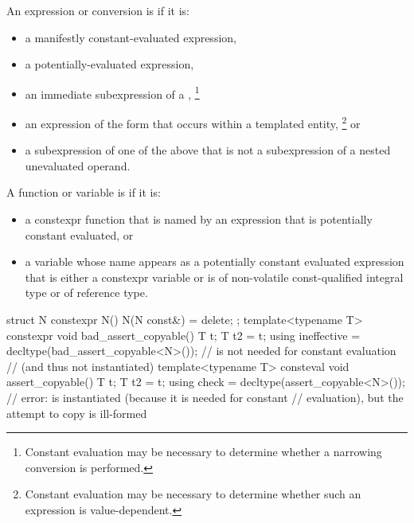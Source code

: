 \pnum
{}%
An expression or conversion is 
if it is:
\begin{itemize}
\item
a manifestly constant-evaluated expression,

\item
a potentially-evaluated expression,

\item
an immediate subexpression of a ,%
\footnote{Constant evaluation may be necessary to determine whether a narrowing conversion is performed.}

\item
an expression of the form \tcode{\&} 
that occurs within a templated entity,%
\footnote{Constant evaluation may be necessary to determine whether such an expression is value-dependent.}
or

\item
a subexpression of one of the above
that is not a subexpression of a nested unevaluated operand.
\end{itemize}

%
%
A function or variable is
if it is:
\begin{itemize}
\item
a constexpr function that is named by an expression
that is potentially constant evaluated, or

\item
a variable whose name appears as a potentially constant evaluated expression
that is either a constexpr variable or
is of non-volatile const-qualified integral type or of reference type.
\end{itemize}

\begin{example}
\begin{codeblock}
struct N {
  constexpr N() {}
  N(N const&) = delete;
};
template<typename T> constexpr void bad_assert_copyable() { T t; T t2 = t; }
using ineffective = decltype(bad_assert_copyable<N>());
                        //  is not needed for constant evaluation
                        // (and thus not instantiated)
template<typename T> consteval void assert_copyable() { T t; T t2 = t; }
using check = decltype(assert_copyable<N>());
                        // error:  is instantiated (because it is needed for constant
                        // evaluation), but the attempt to copy  is ill-formed
\end{codeblock}
\end{example}

